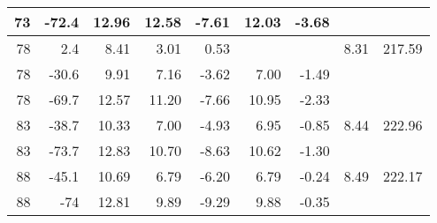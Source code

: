 \begin{table}[H]
\begin{tabular}{|r|r|r|r|r|r|r|r|r|}
            73 &      -72.4 &      12.96 &      12.58 &      -7.61 &      12.03 &      -3.68 &            &            \\
    \hline
            78 &        2.4 &       8.41 &       3.01 &       0.53 &            &            &       8.31 &     217.59 \\
    
            78 &      -30.6 &       9.91 &       7.16 &      -3.62 &       7.00 &      -1.49 &            &            \\
    
            78 &      -69.7 &      12.57 &      11.20 &      -7.66 &      10.95 &      -2.33 &            &            \\
    \hline
            83 &      -38.7 &      10.33 &       7.00 &      -4.93 &       6.95 &      -0.85 &       8.44 &     222.96 \\
    
            83 &      -73.7 &      12.83 &      10.70 &      -8.63 &      10.62 &      -1.30 &            &            \\
    \hline
            88 &      -45.1 &      10.69 &       6.79 &      -6.20 &       6.79 &      -0.24 &       8.49 &     222.17 \\
    
            88 &        -74 &      12.81 &       9.89 &      -9.29 &       9.88 &      -0.35 &            &            \\
    \hline
    \end{tabular} 
    \label{tab: erster Quadrant} 
\end{table}

